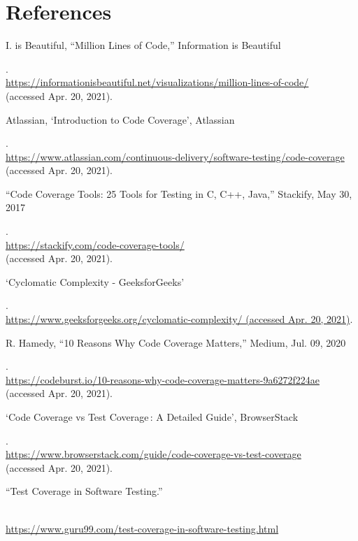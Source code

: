 \documentclass{article}
\begin{document}
\section{References}
\begin{enumerate}[label={[\arabic*]}, noitemsep]
\item \hypertarget{1}{I. is Beautiful, “Million Lines of Code,” Information is Beautiful}. 
    \\\url{https://informationisbeautiful.net/visualizations/million-lines-of-code/} 
    \\(accessed Apr. 20, 2021).
    \\
\item  \hypertarget{2}{Atlassian, ‘Introduction to Code Coverage’, Atlassian}. 
    \\\url{https://www.atlassian.com/continuous-delivery/software-testing/code-coverage} 
    \\(accessed Apr. 20, 2021).
    \\
\item  \hypertarget{3}{“Code Coverage Tools: 25 Tools for Testing in C, C++, Java,” Stackify, May 30, 2017}. 
    \\\url{https://stackify.com/code-coverage-tools/} 
    \\(accessed Apr. 20, 2021).
    \\
\item \hypertarget{4}{‘Cyclomatic Complexity - GeeksforGeeks’}. 
    \\\url{https://www.geeksforgeeks.org/cyclomatic-complexity/ (accessed Apr. 20, 2021)}.
    \\
\item \hypertarget{5}{R. Hamedy, “10 Reasons Why Code Coverage Matters,” Medium, Jul. 09, 2020}. 
    \\\url{https://codeburst.io/10-reasons-why-code-coverage-matters-9a6272f224ae} 
    \\(accessed Apr. 20, 2021).
    \\
\item   \hypertarget{6}{‘Code Coverage vs Test Coverage : A Detailed Guide’, BrowserStack}. 
    \\\url{https://www.browserstack.com/guide/code-coverage-vs-test-coverage} 
    \\(accessed Apr. 20, 2021).
    \\
\item \hypertarget{7}{“Test Coverage in Software Testing.”} 
    \\\url{https://www.guru99.com/test-coverage-in-software-testing.html} 

\end{enumerate}
\end{document}
